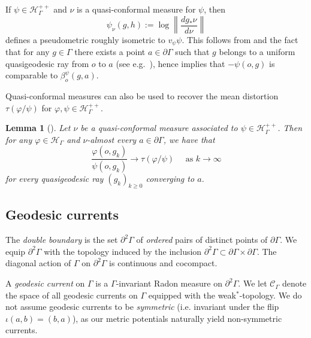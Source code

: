 \documentclass[twoside]{amsart}
\newtheorem{lemma}[theorem]{Lemma}
\theoremstyle{definition}
\numberwithin{equation}{section}
\numberwithin{theorem}{section}
\newcommand{\calC}{\mathcal{C}}
\newcommand{\calH}{\mathcal{H}}
\newcommand{\Hc}{{\mathcal H}}
\newcommand{\G}{\Gamma}
\newcommand{\p}{\psi}
\newcommand{\pG}{\partial \G}
\begin{document}
If $\p\in \calH_\G^{++}$ and $\nu$ is a quasi-conformal measure for $\p$, then 
\begin{equation}\label{eq:defp_nu}
    \p_\nu(g,h):=\log \left\| \frac{dg_*\nu}{d\nu}\right\|
\end{equation}
defines a pseudometric roughly isometric to $v_\p \p$. This follows from  and the fact that for any $g\in \G$ there exists a point $a\in \pG$ such that $g$ belongs to a uniform quasigeodesic ray from $o$ to $a$ (see e.g.~\cite[Equation~2.5]{CRS}), hence  implies that $-\p(o,g)$ is comparable to $\beta^\p_o(g,a)$.

Quasi-conformal measures can also be used to recover the mean distortion $\tau(\varphi/\p)$ for $\varphi, \p \in \Hc^{++}_\G$.
\begin{lemma}[{\cite[Corollary~5.8]{CRS}}]\label{lem:limittauQC}
    Let $\nu$ be a quasi-conformal measure associated to $\p\in \calH_\G^{++}$. Then for any $\varphi\in \calH_\G$ and $\nu$-almost every $a \in \partial \G$, we have that
    \[
\frac{\varphi(o,g_k)}{\p(o,g_k)} \to \tau(\varphi/\p)
   \quad \text{ as }k\to \infty \]
   for every quasigeodesic ray  $(g_k)_{k\geq 0}$ converging to $a$.
\end{lemma}








\subsection{Geodesic currents}\label{subsec:currents}

The \emph{double boundary} is the set
$\partial^2\G$ of \emph{ordered} pairs of distinct points of $\partial \G$.
We equip $\partial^2\G$ with the topology induced by the inclusion
$\partial^2\G \subset \partial \G\times \pG$. The diagonal action
of $\G$ on $\partial^2\G$ is continuous and cocompact.





A \emph{geodesic current} on $\G$ is a $\G$-invariant Radon
measure on $\partial^2\G$.
We let $\calC_\G$ denote the space of all geodesic currents on $\G$
equipped with the weak$^*$-topology. We do not assume geodesic currents to be \emph{symmetric} (i.e. invariant under the flip $\iota(a,b)=(b,a)$), as our metric potentials naturally yield non-symmetric currents. 
\end{document}
